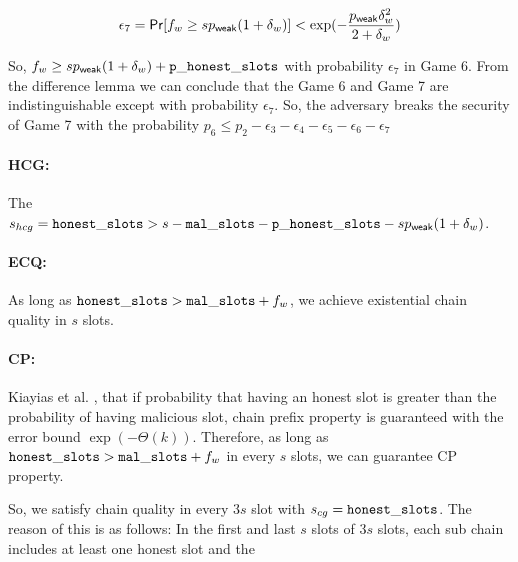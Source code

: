 \begin{enumerate}[label={{Game }}{{\arabic*}}]
	 \begin{equation}
	 \epsilon_7 = \mathsf{Pr}[f_w \geq sp_{\mathsf{weak}}(1+\delta_w)] < \exp(-\frac{p_{\mathsf{weak}}\delta_w^2}{2 + \delta_w})
	 \end{equation}
	 
	So, $ f_w \geq  s p_{\mathsf{weak}}(1+\delta_w) + \mathtt{p\_honest\_slots} $ with probability $ \epsilon_7 $ in Game 6. From the difference lemma we can conclude that the Game 6 and Game 7 are indistinguishable except with probability $ \epsilon_7 $. So, the adversary breaks the security of Game 7 with the probability $ p_6 \leq p_2 - \epsilon_3  - \epsilon_4 - \epsilon_5 - \epsilon_6 -\epsilon_7 $   
	
	
	\paragraph{HCG:} The $ s_{hcg} = \mathtt{honest\_slots} > s - \mathtt{mal\_slots} - \mathtt{p\_honest\_slots} - sp_{\mathsf{weak}}(1+\delta_{w})$.
	
	\paragraph{ECQ:} As long as $ \mathtt{honest\_slots} > \mathtt{mal\_slots} + f_w $, we achieve existential chain quality in $ s $ slots.
	
	\paragraph{CP:} Kiayias et al. \cite{consistency}, that if probability that having an honest slot is greater than the probability of having malicious slot, chain prefix property is guaranteed with the error bound $ \exp(-\Theta(k)) $. Therefore, as long as $ \mathtt{honest\_slots} > \mathtt{mal\_slots} + f_w $ in every $ s $ slots, we can guarantee CP property.


	So, we satisfy chain quality in every $ 3s $ slot with $ s_{cg} = \mathtt{honest\_slots} $. The reason of this is as follows: In the first  and last $ s $ slots of $ 3s $ slots, each sub chain includes at least one honest slot and the 
	    
\end{enumerate}


